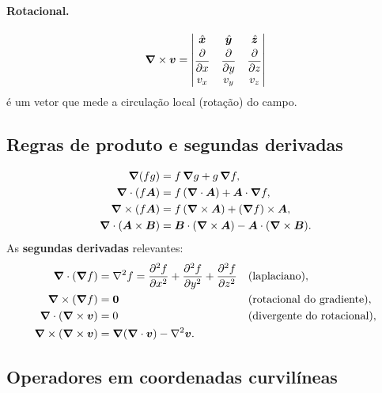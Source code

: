 \paragraph{Rotacional.}
\begin{equation}
  \bm{\nabla}\times\bm{v}=
  \begin{vmatrix}
    \hat{\bm{x}} & \hat{\bm{y}} & \hat{\bm{z}}\\[2pt]
    \dfrac{\partial }{\partial x} & \dfrac{\partial }{\partial y} & \dfrac{\partial }{\partial z}\\[4pt]
    v_x & v_y & v_z
  \end{vmatrix}
\end{equation}
é um vetor que mede a circulação local (rotação) do campo.

\subsection{Regras de produto e segundas derivadas}

\begin{align}
  \bm{\nabla}(fg)&=f\,\bm{\nabla} g+g\,\bm{\nabla} f,\\
  \bm{\nabla}\cdot(f\bm{A})&=f\,(\bm{\nabla}\cdot\bm{A})+\bm{A}\cdot\bm{\nabla} f,\\
  \bm{\nabla}\times(f\bm{A})&=f\,(\bm{\nabla}\times\bm{A})+(\bm{\nabla} f)\times\bm{A},\\
  \bm{\nabla}\cdot(\bm{A}\times\bm{B})&=\bm{B}\cdot(\bm{\nabla}\times\bm{A})-\bm{A}\cdot(\bm{\nabla}\times\bm{B}).
\end{align}
As \textbf{segundas derivadas} relevantes:
\begin{align}
  \bm{\nabla}\cdot(\bm{\nabla} f)&=\nabla^2 f
     =\dfrac{\partial ^2 f}{\partial x^2}+\dfrac{\partial ^2 f}{\partial y^2}+\dfrac{\partial ^2 f}{\partial z^2}
     &&\text{(laplaciano)},\\
  \bm{\nabla}\times(\bm{\nabla} f)&=\bm{0} &&\text{(rotacional do gradiente)},\\
  \bm{\nabla}\cdot(\bm{\nabla}\times\bm{v})&=0 &&\text{(divergente do rotacional)},\\
  \bm{\nabla}\times(\bm{\nabla}\times\bm{v})&=\bm{\nabla}(\bm{\nabla}\cdot\bm{v})-\nabla^2\bm{v}.
\end{align}

\subsection{Operadores em coordenadas curvilíneas}

